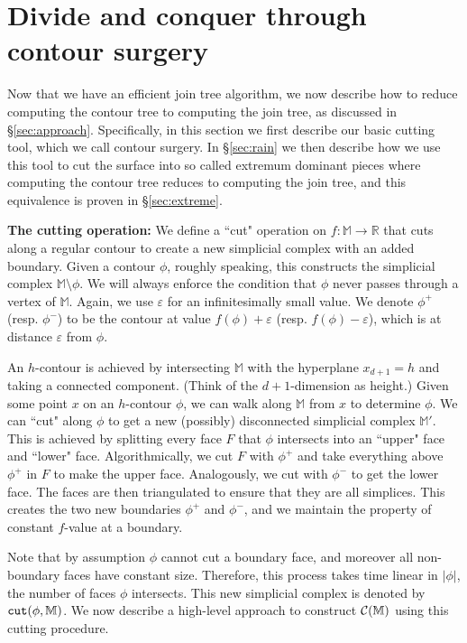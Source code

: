 \documentclass[11pt]{article}
\theoremstyle{definition}
\newcommand{\cC}{{\cal C}}
\newcommand{\MM}{\mathbb{M}}
\newcommand{\RR}{\mathbb{R}}
\newcommand{\eps}{\varepsilon}
\newcommand{\Sec}[1]{\hyperref[sec:#1]{\S\ref*{sec:#1}}} %
\newcommand{\cut}{{\tt cut}}
\newcommand{\reeb}{\cC}
\newcommand{\XSays}[2]{{
      {$\rule[-0.12cm]{0.2in}{0.5cm}$\fbox{\tt
            #1:} }
      \textcolor{red}{#2}
      \marginpar{\textcolor{blue}{#1}}
      {$\rule[0.1cm]{0.3in}{0.1cm}$\fbox{\tt
            end}$\rule[0.1cm]{0.3in}{0.1cm}$}
      }
   }
\renewcommand{\XSays}[2]{}%
\newcommand{\Ben}[1]{{\XSays{Ben}{#1}}}
\begin{document}
\section{Divide and conquer through contour surgery} \label{sec:surgery}
Now that we have an efficient join tree algorithm, we now describe how to 
reduce computing the contour tree to computing the join tree, as discussed in \Sec{approach}.
Specifically, in this section we first describe our basic cutting tool, which we call contour surgery.
In \Sec{rain} we then describe how we use this tool to cut the surface into so called extremum dominant pieces 
where computing the contour tree reduces to computing the join tree, and this equivalence is proven in \Sec{extreme}. 

{\bf The cutting operation:} We define a ``cut" operation on $f:\MM \rightarrow \RR$ that cuts along a regular contour to create
a new simplicial complex with an added boundary. Given a contour $\phi$, roughly speaking, this constructs the simplicial complex $\MM \setminus \phi$. 
We will always enforce the condition that $\phi$ never passes through a vertex of $\MM$.
Again, we use $\eps$ for an infinitesimally small value. We denote $\phi^+$ (resp. $\phi^-$) to be
the contour at value $f(\phi) + \eps$ (resp. $f(\phi) - \eps$), which is at distance $\eps$
from $\phi$. 

An $h$-contour is achieved by intersecting $\MM$ with the hyperplane $x_{d+1} = h$ and taking a connected component. (Think of the $d+1$-dimension
as height.) Given some point $x$ on an $h$-contour $\phi$, we can walk along $\MM$ from $x$ to determine $\phi$.
We can ``cut" along $\phi$ to get a new (possibly) disconnected simplicial complex $\MM'$. This is achieved
by splitting every face $F$ that $\phi$ intersects into an ``upper" face and ``lower" face. Algorithmically,
we cut $F$ with $\phi^+$ and take everything above $\phi^+$ in $F$ to make the upper face. Analogously, we cut with $\phi^-$ to get the lower face.
The faces are then triangulated to ensure that they are all simplices. 
\Ben{Reviewer wanted clarification on how triangulation is done. Maybe can use bottom-vertex triangulation of Clarkson 88, discussed in Matousek book?}
This creates the two new boundaries $\phi^+$ and $\phi^-$, and we maintain the property of constant $f$-value at a boundary.

Note that by assumption $\phi$ cannot cut a boundary face, and moreover all non-boundary faces
have constant size. Therefore, this process takes time linear in $|\phi|$, the number of faces $\phi$ intersects.
This new simplicial complex is denoted by $\cut(\phi,\MM)$.
%
We now describe a high-level approach to construct $\reeb(\MM)$ using this cutting procedure.
\end{document}
